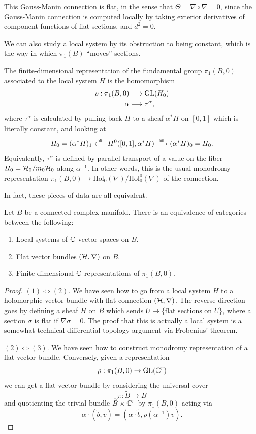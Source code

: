 \documentclass[12pt]{article}
\newcommand{\Hol}{\mathrm{Hol}}
\begin{document}
This Gauss-Manin connection is flat, in the sense that $\Theta = \nabla \circ \nabla = 0$, since the Gauss-Manin connection is computed locally by taking exterior derivatives of component functions of flat sections, and $d^2=0$.

We can also study a local system by its obstruction to being constant, which is the way in which $\pi_1(B)$ ``moves'' sections.

\begin{defn}
    The finite-dimensional representation of the fundamental group $\pi_1(B,0)$ associated to the local system $H$ is the homomorphism
    \begin{align*}
        \rho: \pi_1(B,0) &\longrightarrow \mathrm{GL}(H_0)\\
        \alpha &\longmapsto \tau^\alpha,
    \end{align*}
    where $\tau^\alpha$ is calculated by pulling back $H$ to a sheaf $\alpha^* H$ on $[0,1]$ which is literally constant, and looking at
    \[H_0=(\alpha^* H)_1 \xlongleftarrow{\cong} H^0([0,1],\alpha^*H) \xlongrightarrow{\cong} (\alpha^* H)_0 = H_0.\]
    Equivalently, $\tau^\alpha$ is defined by parallel transport of a value on the fiber $H_0 = \mathcal{H}_0/m_0\mathcal{H}_0$ along $\alpha^{-1}$. In other words, this is the usual monodromy representation $\pi_1(B,0) \to \Hol_0(\nabla)/\Hol_0^0(\nabla)$ of the connection.
\end{defn}

In fact, these pieces of data are all equivalent.
\begin{prop}
    Let $B$ be a connected complex manifold. There is an equivalence of categories between the following:
    \begin{enumerate}
        \item Local systems of $\mathbb{C}$-vector spaces on $B$.
        \item Flat vector bundles $(\mathcal{H},\nabla)$ on $B$.
        \item Finite-dimensional $\mathbb{C}$-representations of $\pi_1(B,0)$.
    \end{enumerate}
\end{prop}
\begin{proof}
    $(1)\iff(2)$. We have seen how to go from a local system $H$ to a holomorphic vector bundle with flat connection $(\mathcal{H},\nabla)$. The reverse direction goes by defining a sheaf $H$ on $B$ which sends $U\mapsto \{\text{flat sections on } U\}$, where a section $\sigma$ is flat if $\nabla \sigma = 0$. The proof that this is actually a local system is a somewhat technical differential topology argument via Frobenius' theorem.

    $(2)\iff(3)$. We have seen how to construct monodromy representation of a flat vector bundle. Conversely, given a representation
    \[\rho: \pi_1(B,0) \to \mathrm{GL}(\mathbb{C}^r)\]
    we can get a flat vector bundle by considering the universal cover
    \[\pi: \tilde{B} \to B\]
    and quotienting the trivial bundle $\widetilde{B}\times \mathbb{C}^r$ by $\pi_1(B,0)$ acting via
    \[\alpha \cdot (\tilde{b},v) = (\alpha\cdot \tilde{b},\rho(\alpha^{-1})v).\]
\end{proof}
\end{document}
